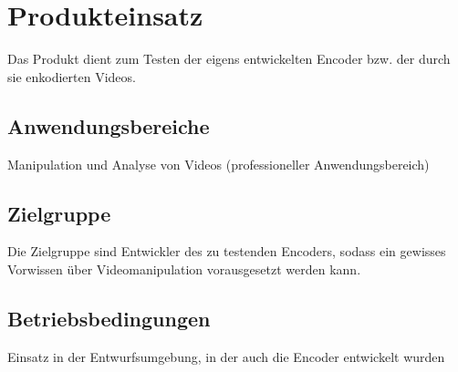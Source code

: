 \section{Produkteinsatz}

Das Produkt dient zum Testen der eigens entwickelten Encoder bzw. der durch sie enkodierten Videos.

\subsection{Anwendungsbereiche}

Manipulation und Analyse von Videos (professioneller Anwendungsbereich)

\subsection{Zielgruppe}

Die Zielgruppe sind Entwickler des zu testenden Encoders, sodass ein gewisses Vorwissen über Videomanipulation vorausgesetzt werden kann.

\subsection{Betriebsbedingungen}

Einsatz in der Entwurfsumgebung, in der auch die Encoder entwickelt wurden
